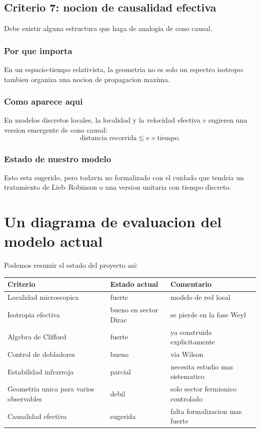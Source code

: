 \subsection{Criterio 7: nocion de causalidad efectiva}
Debe existir alguna estructura que haga de analogia de cono causal.

\subsubsection*{Por que importa}
En un espacio-tiempo relativista, la geometria no es solo un espectro isotropo: tambien organiza una nocion de propagacion maxima.

\subsubsection*{Como aparece aqui}
En modelos discretos locales, la localidad y la velocidad efectiva \(v\) sugieren una version emergente de cono causal:
\begin{equation}
\text{distancia recorrida} \lesssim v \times \text{tiempo}.
\end{equation}

\subsubsection*{Estado de nuestro modelo}
Esto esta sugerido, pero todavia no formalizado con el cuidado que tendria un tratamiento de Lieb--Robinson o una version unitaria con tiempo discreto.

\section{Un diagrama de evaluacion del modelo actual}
Podemos resumir el estado del proyecto asi:

\begin{center}
\begin{tabular}{p{5.2cm} p{3.3cm} p{5cm}}
\toprule
Criterio & Estado actual & Comentario \\
\midrule
Localidad microscopica & fuerte & modelo de red local \\
Isotropia efectiva & bueno en sector Dirac & se pierde en la fase Weyl \\
Algebra de Clifford & fuerte & ya construida explicitamente \\
Control de dobladores & bueno & via Wilson \\
Estabilidad infrarroja & parcial & necesita estudio mas sistematico \\
Geometria unica para varios observables & debil & solo sector fermionico controlado \\
Causalidad efectiva & sugerida & falta formalizacion mas fuerte \\
\bottomrule
\end{tabular}
\end{center}


